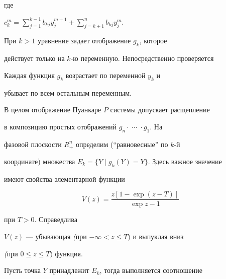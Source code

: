 где 


$c_k^m=\sum\limits_{j=1}^{k-1}b_{kj}y_j^{m+1}+


\sum\limits_{j=k+1}^{n}b_{kj}y_j^{m}$. 


При $k>1$ уравнение  задает отображение $g_k$, которое 


действует только на $k$-ю переменную. Непосредственно проверяется





\begin{lems}%


Каждая функция $g_k$ возрастает по переменной $y_k$ и 


убывает по всем остальным переменным.


\end{lems}%





В целом отображение Пуанкаре $P$ системы  допускает расщепление


в композицию простых отображений $g_n\cdot\; \dotsb\;\cdot g_1$. На 


фазовой плоскости $R_+^n$ определим (``равновесные'' по $k$-й 


координате) множества $E_k=\{Y\mid g_k(Y)=Y\}$. Здесь важное значение 


имеют свойства элементарной функции


\begin{equation}


V(z)=\frac{z[1-\exp(z-T)]}{\exp z -1}


\label{2.4}


\end{equation}


при $T>0$. Справедлива





\begin{lems}%


$V(z)$ --- убывающая {\em (}при $-\infty<z\leqslant T)$ и выпуклая вниз 


{\em (}при $0\leqslant z\leqslant T)$ функция.


\end{lems}%





Пусть точка $Y$ принадлежит $E_k$, тогда выполняется соотношение


$$


